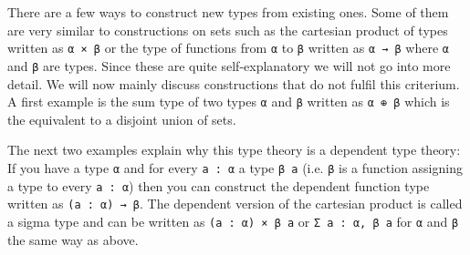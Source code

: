 There are a few ways to construct new types from existing ones. 
Some of them are very similar to constructions on sets such as the cartesian product of types written as \lstinline{α × β} or the type of functions from \lstinline{α} to \lstinline{β} written as \lstinline{α → β} where \lstinline{α} and \lstinline{β} are types.
Since these are quite self-explanatory we will not go into more detail.
We will now mainly discuss constructions that do not fulfil this criterium. 
A first example is the sum type of two types \lstinline{α} and \lstinline{β} written as \lstinline{α ⊕ β} which is the equivalent to a disjoint union of sets. 

The next two examples explain why this type theory is a dependent type theory:
If you have a type \lstinline{α} and for every \lstinline{a : α} a type \lstinline{β a} (i.e. \lstinline{β} is a function assigning a type to every \lstinline{a : α}) then you can construct the dependent function type written as \lstinline{(a : α) → β}. 
The dependent version of the cartesian product is called a sigma type and can be written as \lstinline{(a : α) × β a} or \lstinline{Σ a : α, β a} for \lstinline{α} and \lstinline{β} the same way as above.